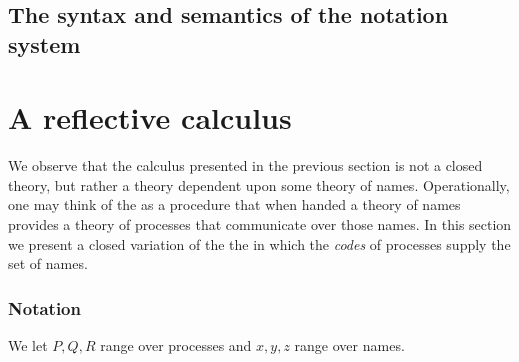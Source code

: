 \subsection{The syntax and semantics of the notation system}\label{sub:the_syntax_and_semantics_of_the_notation_system} %



\section{A reflective calculus}

We observe that the calculus presented in the previous section is not
a closed theory, but rather a theory dependent upon some theory of
names. Operationally, one may think of the {\pic} as a procedure that
when handed a theory of names provides a theory of processes that
communicate over those names. In this section we present a closed
variation of the the {\pic} in which the \emph{codes} of processes
supply the set of names.

\subsubsection{Notation}

We let ${P, Q, R}$ range over processes and ${x, y, z}$ range over names.


